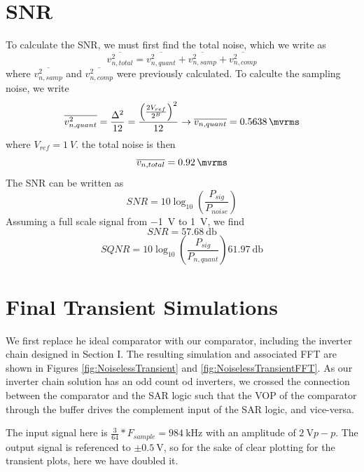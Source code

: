 \documentclass[letterpaper, notitlepage]{revtex4-1}
\begin{document}
\section{SNR}
To calculate the SNR, we must first find the total noise, which we write as
\begin{equation}
\overline{v_{n,total}^2}=\overline{v_{n,quant}^2}+\overline{v_{n,samp}^2}+\overline{v_{n,comp}^2}
\end{equation}
where $\overline{v_{n,samp}^2}$ and $\overline{v_{n,comp}^2}$ were previously calculated. To calculte the sampling noise, we write
\begin{equation}
\overline{v_{n,quant}^2}=\frac{\Delta^2}{12}=\frac{\left(\frac{2V_{ref}}{2^B}\right)^2}{12}\rightarrow\overline{v_{n,quant}}=\SI{0.5638}{\mvrms}
\end{equation}
where $V_{ref}=\SI{1}{V}$. the total noise is then
\begin{equation}
\overline{v_{n,total}}=\SI{0.92}{\mvrms}
\end{equation}
The SNR can be written as
\begin{equation}
SNR=10\log_{10}\left(\frac{P_{sig}}{P_{noise}}\right)
\end{equation}
Assuming a full scale signal from \SI{-1}{\volt} to \SI{1}{\volt}, we find
\begin{equation}
SNR=\SI{57.68}{\decibel}
\end{equation}
\begin{equation}
SQNR=10\log_{10}\left(\frac{P_{sig}}{P_{n,quant}}\right)\SI{61.97}{\decibel}
\end{equation}

\clearpage

\section{Final Transient Simulations}

  We first replace he ideal comparator with our comparator, including the
  inverter chain designed in Section I. The resulting simulation and
  associated FFT are shown in Figures \ref{fig:NoiselessTransient} and
  \ref{fig:NoiselessTransientFFT}. As our inverter chain solution has an odd
  count od inverters, we crossed the connection between the comparator and the
  SAR logic such that the VOP of the comparator through the buffer drives the
  complement input of the SAR logic, and vice-versa.

  The input signal here is $\frac{3}{64} * F_{sample} = \SI{984}{\kilo\hertz}$
  with an amplitude of $\SI{2}{\volt} p-p$. The output signal is referenced
  to $\pm\SI{0.5}{\volt}$, so for the sake of clear plotting for the transient
  plots, here we have doubled it.
\end{document}
